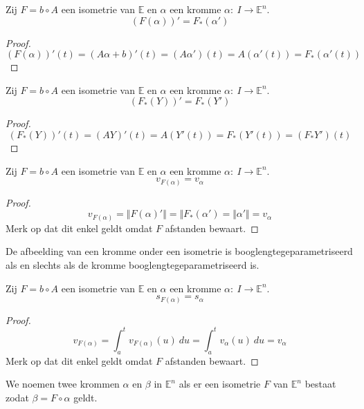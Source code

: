 \documentclass[main.tex]{subfiles}
\begin{document}
\begin{st}
  Zij $F = b \circ A$ een isometrie van $\mathbb{E}$ en $\alpha$ een kromme $\alpha:\ I\rightarrow \mathbb{E}^{n}$.
  \[ (F(\alpha))' = F_{*}(\alpha') \]
  \begin{proof}
    \[ (F(\alpha))'(t) = (A\alpha + b)'(t) = (A\alpha')(t) = A(\alpha'(t)) = F_{*}(\alpha'(t)) \]
  \end{proof}
\end{st}

\begin{st}
  Zij $F = b \circ A$ een isometrie van $\mathbb{E}$ en $\alpha$ een kromme $\alpha:\ I\rightarrow \mathbb{E}^{n}$.
  \[ (F_{*}(Y))' = F_{*}(Y') \]
  \begin{proof}
    \[ (F_{*}(Y))'(t) = (AY)'(t) = A(Y'(t)) = F_{*}(Y'(t)) = (F_{*}Y')(t) \]
  \end{proof}
\end{st}

\begin{st}
  Zij $F = b \circ A$ een isometrie van $\mathbb{E}$ en $\alpha$ een kromme $\alpha:\ I\rightarrow \mathbb{E}^{n}$.
  \[ v_{F(\alpha)} = v_{\alpha} \]
  \begin{proof}
    \[ v_{F(\alpha)} = \Vert F(\alpha)' \Vert = \Vert F_{*}(\alpha') = \Vert \alpha' \Vert = v_{\alpha} \]
    Merk op dat dit enkel geldt omdat $F$ afstanden bewaart.
  \end{proof}
\end{st}

\begin{gev}
  De afbeelding van een kromme onder een isometrie is booglengtegeparametriseerd als en slechts als de kromme booglengtegeparametriseerd is.
\end{gev}

\begin{st}
  Zij $F = b \circ A$ een isometrie van $\mathbb{E}$ en $\alpha$ een kromme $\alpha:\ I\rightarrow \mathbb{E}^{n}$.
  \[ s_{F(\alpha)} = s_{\alpha} \]
  \begin{proof}
    \[ v_{F(\alpha)} = \int_{a}^{t}v_{F(\alpha)}(u)\ du = \int_{a}^{t}v_{\alpha}(u)\ du= v_{\alpha} \]
    Merk op dat dit enkel geldt omdat $F$ afstanden bewaart.
  \end{proof}
\end{st}


\begin{de}
  We noemen twee krommen $\alpha$ en $\beta$ in $\mathbb{E}^{n}$  als er een isometrie $F$ van $\mathbb{E}^{n}$ bestaat zodat $\beta = F \circ \alpha$ geldt.
\end{de}
\end{document}
